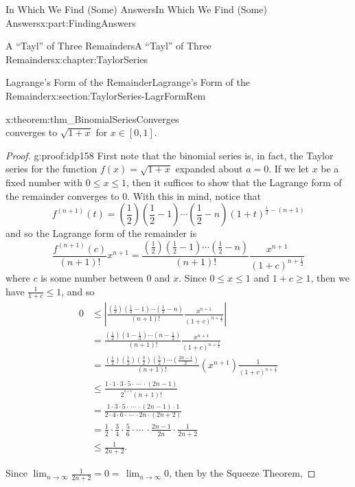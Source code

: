 \documentclass[oneside,10pt,]{book}
\numberwithin{equation}{section}
\newcommand{\amp}{&}
\begin{document}
\begin{partptx}{In Which We Find (Some) Answers}{}{In Which We Find (Some) Answers}{}{}{x:part:FindingAnswers}
\begin{chapterptx}{A ``Tayl'' of Three Remainders}{}{A ``Tayl'' of Three Remainders}{}{}{x:chapter:TaylorSeries}
\begin{sectionptx}{Lagrange's Form of the Remainder}{}{Lagrange's Form of the Remainder}{}{}{x:section:TaylorSeries-LagrFormRem}
\begin{theorem}{}{}{x:theorem:thm_BinomialSeriesConverges}
\begin{equation*}
\end{equation*}
converges to \(\sqrt{1+x}\) for \(x\in[0,1]\).%
\end{theorem}
\begin{proof}{}{g:proof:idp158}
First note that the binomial series is, in fact, the Taylor series for the function \(f(x)=\sqrt{1+x}\) expanded about \(a=0\). If we let \(x\) be a fixed number with \(0\leq x\leq 1\), then it suffices to show that the Lagrange form of the remainder converges to \(0\). With this in mind, notice that%
\begin{equation*}
f^{(n+1)}(t)=\left(\frac{1}{2}\right)\left(\frac{1}{2}-1\right)\cdots\left(\frac{1}{2}-n\right)\left(1+t\right)^{\frac{1}{2}-(n+1)}
\end{equation*}
and so the Lagrange form of the remainder is%
\begin{equation*}
\frac{f^{(n+1)}(c)}{(n+1)!}x^{n+1}= \frac{\left(\frac{1}{2}\right)\left(\frac{1}{2}-1\right)\cdots \left(\frac{1}{2}-n\right)}{(n+1)!}\frac{x^{n+1}}{(1+c)^{n+\frac{1}{2}}}
\end{equation*}
where \(c\) is some number between \(0\) and \(x\). Since \(0\leq x\leq 1\) and \(1+c\geq 1\), then we have \(\frac{1}{1+c}\leq 1\), and so%
\begin{align*}
0\amp \leq \left|\frac{\left(\frac{1}{2}\right)\left(\frac{1}{2}-1\right)\cdots\left(\frac{1}{2}-n\right)}{(n+1)!}\frac{x^{n+1}}{(1+c)^{n+\frac{1}{2}}}\right|\\
\amp =\frac{\left(\frac{1}{2}\right)\left(1-\frac{1}{2}\right)\cdots\left(n-\frac{1}{2}\right)}{(n+1)!}\frac{x^{n+1}}{(1+c)^{n+\frac{1}{2}}}\\
\amp =\frac{\left(\frac{1}{2}\right)\left(\frac{1}{2}\right)\left(\frac{3}{2}\right)\left(\frac{5}{2}\right)\cdots\left(\frac{2n-1}{2}\right)}{(n+1)!}\left(x^{n+1}\right)\frac{1}{(1+c)^{n+\frac{1}{2}}}\\
\amp \leq\frac{1\cdot 1\cdot 3\cdot5\cdot\,\cdots\,\cdot\left(2n-1\right)}{2^{^{n+1}}(n+1)!}\\
\amp =\frac{1\cdot 3\cdot 5\cdot\,\cdots\,\cdot\left(2n-1\right)\cdot 1}{2\cdot4\cdot 6\cdot\,\cdots\,\cdot 2n\cdot\left(2n+2\right)}\\
\amp =\frac{1}{2}\cdot\frac{3}{4}\cdot\frac{5}{6}\cdot\cdots\,\cdot\frac{2n-1}{2n}\cdot\frac{1}{2n+2}\\
\amp \leq\frac{1}{2n+2}\text{.}
\end{align*}
%
\par
Since \(\lim_{n\rightarrow\infty}\frac{1}{2n+2}=0=\,\lim_{n\rightarrow\infty}0\), then by the Squeeze Theorem,%

\end{proof}
\end{sectionptx}
\end{chapterptx}
\end{partptx}
\end{document}
